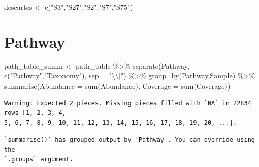 \documentclass[
  letterpaper,
  DIV=11,
  numbers=noendperiod]{scrartcl}
\newenvironment{Shaded}{\begin{snugshade}}{\end{snugshade}}
\newcommand{\AttributeTok}[1]{\textcolor[rgb]{0.40,0.45,0.13}{#1}}
\newcommand{\FunctionTok}[1]{\textcolor[rgb]{0.28,0.35,0.67}{#1}}
\newcommand{\NormalTok}[1]{\textcolor[rgb]{0.00,0.23,0.31}{#1}}
\newcommand{\OtherTok}[1]{\textcolor[rgb]{0.00,0.23,0.31}{#1}}
\newcommand{\SpecialCharTok}[1]{\textcolor[rgb]{0.37,0.37,0.37}{#1}}
\newcommand{\StringTok}[1]{\textcolor[rgb]{0.13,0.47,0.30}{#1}}
\begin{document}
\begin{Shaded}
\begin{Highlighting}[]
\NormalTok{descartes }\OtherTok{\textless{}{-}} \FunctionTok{c}\NormalTok{(}\StringTok{"S3"}\NormalTok{,}\StringTok{"S27"}\NormalTok{,}\StringTok{"S2"}\NormalTok{,}\StringTok{"S7"}\NormalTok{,}\StringTok{"S75"}\NormalTok{)}
\end{Highlighting}
\end{Shaded}

\hypertarget{pathway}{%
\section{Pathway}\label{pathway}}

\begin{Shaded}
\begin{Highlighting}[]
\NormalTok{path\_table\_summ }\OtherTok{\textless{}{-}}\NormalTok{ path\_table }\SpecialCharTok{\%\textgreater{}\%} 
  \FunctionTok{separate}\NormalTok{(Pathway, }\FunctionTok{c}\NormalTok{(}\StringTok{"Pathway"}\NormalTok{,}\StringTok{"Taxonomy"}\NormalTok{), }\AttributeTok{sep =} \StringTok{"}\SpecialCharTok{\textbackslash{}\textbackslash{}}\StringTok{|"}\NormalTok{) }\SpecialCharTok{\%\textgreater{}\%} 
  \FunctionTok{group\_by}\NormalTok{(Pathway,Sample) }\SpecialCharTok{\%\textgreater{}\%} 
  \FunctionTok{summarise}\NormalTok{(}\AttributeTok{Abundance =} \FunctionTok{sum}\NormalTok{(Abundance), }\AttributeTok{Coverage =} \FunctionTok{sum}\NormalTok{(Coverage))}
\end{Highlighting}
\end{Shaded}

\begin{verbatim}
Warning: Expected 2 pieces. Missing pieces filled with `NA` in 22834 rows [1, 2, 3, 4,
5, 6, 7, 8, 9, 10, 11, 12, 13, 14, 15, 16, 17, 18, 19, 20, ...].
\end{verbatim}

\begin{verbatim}
`summarise()` has grouped output by 'Pathway'. You can override using the
`.groups` argument.
\end{verbatim}
\end{document}
